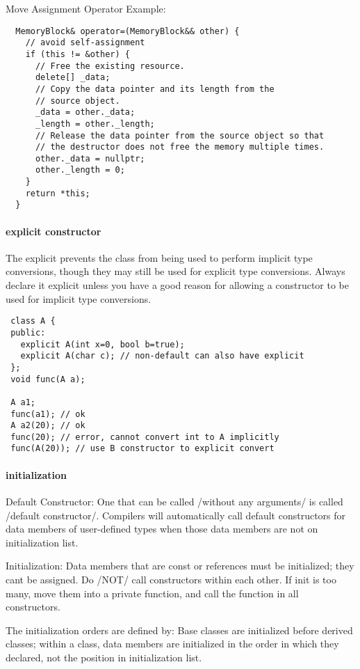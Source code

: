 Move Assignment Operator Example:
\begin{lstlisting}
  MemoryBlock& operator=(MemoryBlock&& other) {
    // avoid self-assignment
    if (this != &other) {
      // Free the existing resource.
      delete[] _data;
      // Copy the data pointer and its length from the 
      // source object.
      _data = other._data;
      _length = other._length;
      // Release the data pointer from the source object so that
      // the destructor does not free the memory multiple times.
      other._data = nullptr;
      other._length = 0;
    }
    return *this;
  }
\end{lstlisting}

\paragraph{explicit constructor}
The explicit prevents the class from being used to perform implicit type conversions,
though they may still be used for explicit type conversions.
Always declare it explicit unless you have a good reason
for allowing a constructor to be used for implicit type conversions.

\begin{lstlisting}
 class A {
 public:
   explicit A(int x=0, bool b=true);
   explicit A(char c); // non-default can also have explicit
 };
 void func(A a);

 A a1;
 func(a1); // ok
 A a2(20); // ok
 func(20); // error, cannot convert int to A implicitly
 func(A(20)); // use B constructor to explicit convert
\end{lstlisting}
\paragraph{initialization}
 
Default Constructor: One that can be called /without any arguments/ is
called /default constructor/.  Compilers will automatically call
default constructors for data members of user-defined types when those
data members are not on initialization list.

Initialization: Data members that are const or references must be
initialized; they cant be assigned.  Do /NOT/ call constructors within
each other.  If init is too many, move them into a private function,
and call the function in all constructors.

The initialization orders are defined by: Base classes are initialized
before derived classes; within a class, data members are initialized
in the order in which they declared, not the position in
initialization list.

